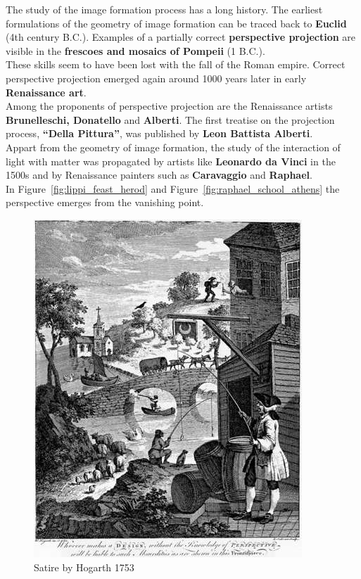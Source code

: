 The study of the image formation process has a long history.
The earliest formulations of the geometry of image formation
can be traced back to \textbf{Euclid} (4th century B.C.).
Examples of a partially correct \textbf{perspective projection}
are visible in the \textbf{frescoes and mosaics of Pompeii} (1 B.C.).\\

These skills seem to have been lost with the fall of the Roman empire.
Correct perspective projection emerged again around 1000 years later
in early \textbf{Renaissance art}.\\

Among the proponents of perspective projection are the
Renaissance artists \textbf{Brunelleschi, Donatello} and \textbf{Alberti}.
The first treatise on the projection process, \textbf{``Della Pittura''},
was published by \textbf{Leon Battista Alberti}.\\

Appart from the geometry of image formation, the study of the
interaction of light with matter was propagated by artists like
\textbf{Leonardo da Vinci} in the 1500s and by Renaissance painters
such as \textbf{Caravaggio} and \textbf{Raphael}.\\

In Figure~\ref{fig:lippi_feast_herod} and Figure~\ref{fig:raphael_school_athens}
the perspective emerges from the vanishing point.

\begin{figure}[h]
\centering
\includegraphics[width=0.5\columnwidth]{assets/img/hogarth_satire.jpg}
\caption{Satire by Hogarth 1753}%
\label{fig:hogarth_satire}
\end{figure}

